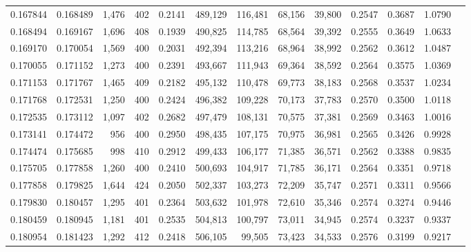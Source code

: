 \begin{tabular}{rrrrrrrrrrrrr}
0.167844 & 0.168489 & 1,476 & 402 &                                     0.2141 & 489,129 & 116,481 &  68,156 &  39,800 & 0.2547 & 0.3687 & 1.0790 \\
0.168494 & 0.169167 & 1,696 & 408 &                                     0.1939 & 490,825 & 114,785 &  68,564 &  39,392 & 0.2555 & 0.3649 & 1.0633 \\
0.169170 & 0.170054 & 1,569 & 400 &                                     0.2031 & 492,394 & 113,216 &  68,964 &  38,992 & 0.2562 & 0.3612 & 1.0487 \\
0.170055 & 0.171152 & 1,273 & 400 &                                     0.2391 & 493,667 & 111,943 &  69,364 &  38,592 & 0.2564 & 0.3575 & 1.0369 \\
0.171153 & 0.171767 & 1,465 & 409 &                                     0.2182 & 495,132 & 110,478 &  69,773 &  38,183 & 0.2568 & 0.3537 & 1.0234 \\
0.171768 & 0.172531 & 1,250 & 400 &                                     0.2424 & 496,382 & 109,228 &  70,173 &  37,783 & 0.2570 & 0.3500 & 1.0118 \\
0.172535 & 0.173112 & 1,097 & 402 &                                     0.2682 & 497,479 & 108,131 &  70,575 &  37,381 & 0.2569 & 0.3463 & 1.0016 \\
0.173141 & 0.174472 &   956 & 400 &                                     0.2950 & 498,435 & 107,175 &  70,975 &  36,981 & 0.2565 & 0.3426 & 0.9928 \\
0.174474 & 0.175685 &   998 & 410 &                                     0.2912 & 499,433 & 106,177 &  71,385 &  36,571 & 0.2562 & 0.3388 & 0.9835 \\
0.175705 & 0.177858 & 1,260 & 400 &                                     0.2410 & 500,693 & 104,917 &  71,785 &  36,171 & 0.2564 & 0.3351 & 0.9718 \\
0.177858 & 0.179825 & 1,644 & 424 &                                     0.2050 & 502,337 & 103,273 &  72,209 &  35,747 & 0.2571 & 0.3311 & 0.9566 \\
0.179830 & 0.180457 & 1,295 & 401 &                                     0.2364 & 503,632 & 101,978 &  72,610 &  35,346 & 0.2574 & 0.3274 & 0.9446 \\
0.180459 & 0.180945 & 1,181 & 401 &                                     0.2535 & 504,813 & 100,797 &  73,011 &  34,945 & 0.2574 & 0.3237 & 0.9337 \\
0.180954 & 0.181423 & 1,292 & 412 &                                     0.2418 & 506,105 &  99,505 &  73,423 &  34,533 & 0.2576 & 0.3199 & 0.9217 \\

\end{tabular}
